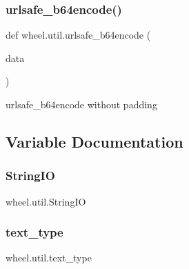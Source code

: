 \subsubsection{\texorpdfstring{urlsafe\+\_\+b64encode()}{urlsafe\_b64encode()}}
{\footnotesize\ttfamily def wheel.\+util.\+urlsafe\+\_\+b64encode (\begin{DoxyParamCaption}\item[{}]{data }\end{DoxyParamCaption})}

\begin{DoxyVerb}urlsafe_b64encode without padding\end{DoxyVerb}
 

\subsection{Variable Documentation}
\mbox{\label{namespacewheel_1_1util_a3da83464d837e18181c5f2bd31bb9b17}} 
\subsubsection{\texorpdfstring{String\+IO}{StringIO}}
{\footnotesize\ttfamily wheel.\+util.\+String\+IO}

\mbox{\label{namespacewheel_1_1util_a48320c7630d85d2d1d4b12d6b08c3e9a}} 
\subsubsection{\texorpdfstring{text\+\_\+type}{text\_type}}
{\footnotesize\ttfamily wheel.\+util.\+text\+\_\+type}

